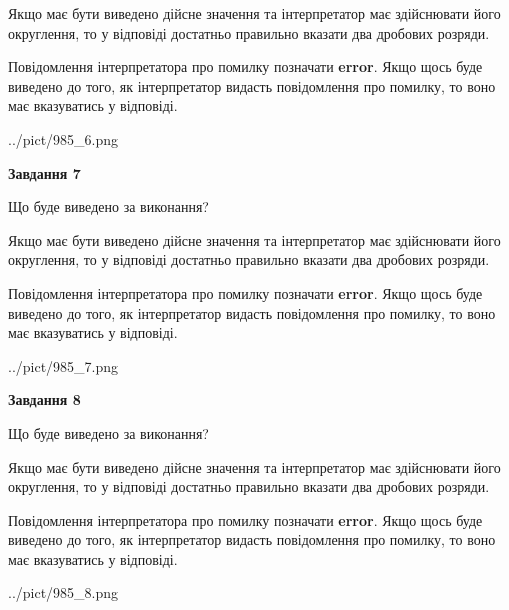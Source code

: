 \documentclass[12pt, ukrainian]{article}
\begin{document}
{\begin {Large}
Якщо має бути виведено дійсне значення та інтерпретатор має здійснювати його округлення, 
то у відповіді достатньо правильно вказати два дробових розряди.

Повідомлення інтерпретатора про помилку позначати \textbf{error}.
Якщо щось буде виведено до того, як інтерпретатор видасть повідомлення про помилку, 
то воно має вказуватись у відповіді. \par

\begin{center}
	{../pict/985_6.png}
\end{center}
\newpage

{\begin {center}\textbf{Завдання 7}\end {center}}\par
Що буде виведено за виконання? \par

Якщо має бути виведено дійсне значення та інтерпретатор має здійснювати його округлення, 
то у відповіді достатньо правильно вказати два дробових розряди.

Повідомлення інтерпретатора про помилку позначати \textbf{error}.
Якщо щось буде виведено до того, як інтерпретатор видасть повідомлення про помилку, 
то воно має вказуватись у відповіді. \par

\begin{center}
	{../pict/985_7.png}
\end{center}
\newpage

{\begin {center}\textbf{Завдання 8}\end {center}}\par
Що буде виведено за виконання? \par

Якщо має бути виведено дійсне значення та інтерпретатор має здійснювати його округлення, 
то у відповіді достатньо правильно вказати два дробових розряди.

Повідомлення інтерпретатора про помилку позначати \textbf{error}.
Якщо щось буде виведено до того, як інтерпретатор видасть повідомлення про помилку, 
то воно має вказуватись у відповіді. \par

\begin{center}
	{../pict/985_8.png}
\end{center}
\newpage


\end{Large}}
\end{document}

